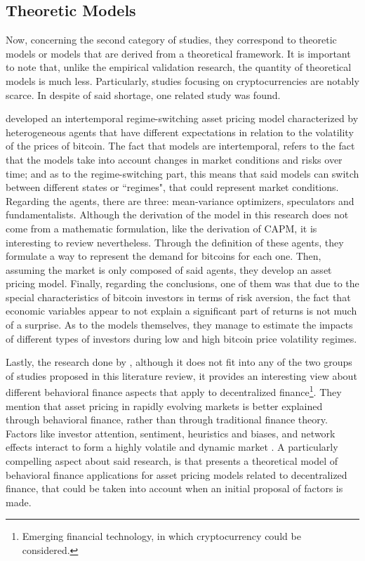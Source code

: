 \subsection{Theoretic Models}
Now, concerning the second category of studies, they correspond to theoretic models or models that are derived from a theoretical framework. It is important to note that, unlike the empirical validation research, the quantity of theoretical models is much less. Particularly, studies focusing on cryptocurrencies are notably scarce. In despite of said shortage, one related study was found.

\parencite{koutmos2021intertemporal} developed an intertemporal regime-switching asset pricing model characterized by heterogeneous agents that have different expectations in relation to the volatility of the prices of bitcoin. The fact that models are intertemporal, refers to the fact that the models take into account changes in market conditions and risks over time; and as to the regime-switching part, this means that said models can switch between different states or ``regimes", that could represent market conditions. Regarding the agents, there are three: mean-variance optimizers, speculators and fundamentalists. Although the derivation of the model in this research does not come from a mathematic formulation, like the derivation of CAPM, it is interesting to review nevertheless. Through the definition of these agents, they formulate a way to represent the demand for bitcoins for each one. Then, assuming the market is only composed of said agents, they develop an asset pricing model. Finally, regarding the conclusions, one of them was that due to the special characteristics of bitcoin investors in terms of risk aversion, the fact that economic variables appear to not explain a significant part of returns is not much of a surprise. As to the models themselves, they manage to estimate the impacts of different types of investors during low and high bitcoin price volatility regimes.

Lastly, the research done by \parencite{Bennett2023}, although it does not fit into any of the two groups of studies proposed in this literature review, it provides an interesting view about different behavioral finance aspects that apply to decentralized finance\footnote{Emerging financial technology, in which cryptocurrency could be considered.}. They mention that asset pricing in rapidly evolving markets is better explained through behavioral finance, rather than through traditional finance theory. Factors like investor attention, sentiment, heuristics and biases, and network effects interact to form a highly volatile and dynamic market \parencite{Bennett2023}. A particularly compelling aspect about said research, is that presents a theoretical model of behavioral finance applications for asset pricing models related to decentralized finance, that could be taken into account when an initial proposal of factors is made. 

